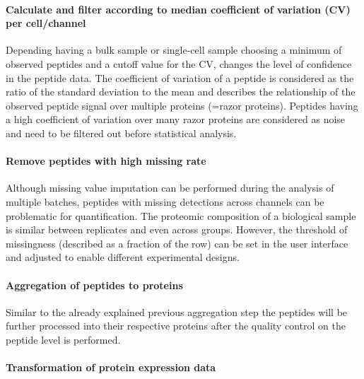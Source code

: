 \documentclass[
]{article}
\begin{document}
\hypertarget{calculate-and-filter-according-to-median-coefficient-of-variation-cv-per-cellchannel}{%
\paragraph{Calculate and filter according to median coefficient of
variation (CV) per
cell/channel}\label{calculate-and-filter-according-to-median-coefficient-of-variation-cv-per-cellchannel}}

Depending having a bulk sample or single-cell sample choosing a minimum
of observed peptides and a cutoff value for the CV, changes the level of
confidence in the peptide data. The coefficient of variation of a
peptide is considered as the ratio of the standard deviation to the mean
and describes the relationship of the observed peptide signal over
multiple proteins (=razor proteins). Peptides having a high coefficient
of variation over many razor proteins are considered as noise and need
to be filtered out before statistical analysis.

\hypertarget{remove-peptides-with-high-missing-rate}{%
\paragraph{Remove peptides with high missing
rate}\label{remove-peptides-with-high-missing-rate}}

Although missing value imputation can be performed during the analysis
of multiple batches, peptides with missing detections across channels
can be problematic for quantification. The proteomic composition of a
biological sample is similar between replicates and even across groups.
However, the threshold of missingness (described as a fraction of the
row) can be set in the user interface and adjusted to enable different
experimental designs.

\hypertarget{aggregation-of-peptides-to-proteins}{%
\paragraph{Aggregation of peptides to
proteins}\label{aggregation-of-peptides-to-proteins}}

Similar to the already explained previous aggregation step the peptides
will be further processed into their respective proteins after the
quality control on the peptide level is performed.

\hypertarget{transformation-of-protein-expression-data}{%
\paragraph{Transformation of protein expression
data}\label{transformation-of-protein-expression-data}}
\end{document}
